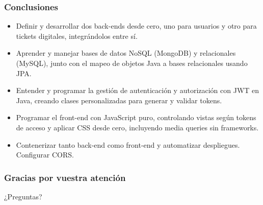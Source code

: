 \documentclass{beamer}
\begin{document}
	\begin{frame}
		\frametitle{Conclusiones}
\begin{itemize}
	\setlength{\itemsep}{.0em}
	\item Definir y desarrollar dos back-ends desde cero, uno para usuarios y otro para tickets digitales, integrándolos entre sí.
	\item Aprender y manejar bases de datos NoSQL (MongoDB) y relacionales (MySQL), junto con el mapeo de objetos Java a bases relacionales usando JPA.
	\item Entender y programar la gestión de autenticación y autorización con JWT en Java, creando clases personalizadas para generar y validar tokens.
	\item Programar el front-end con JavaScript puro, controlando vistas según tokens de acceso y aplicar CSS desde cero, incluyendo media queries sin frameworks.
	\item Contenerizar tanto back-end como front-end y automatizar despliegues. Configurar CORS.
\end{itemize}

	\end{frame}
	
	\begin{frame}
		\frametitle{Gracias por vuestra atención}
		¿Preguntas?
	\end{frame}
	
	
	
	
	
	
	
	
	
\end{document}
